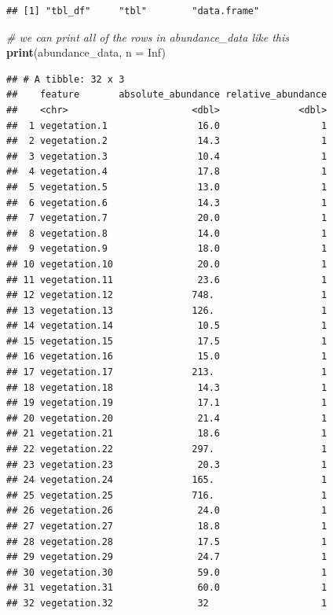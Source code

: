 \documentclass[12pt,]{book}
\newenvironment{Shaded}{\begin{snugshade}}{\end{snugshade}}
\newcommand{\KeywordTok}[1]{\textcolor[rgb]{0.13,0.29,0.53}{\textbf{#1}}}
\newcommand{\DataTypeTok}[1]{\textcolor[rgb]{0.13,0.29,0.53}{#1}}
\newcommand{\CommentTok}[1]{\textcolor[rgb]{0.56,0.35,0.01}{\textit{#1}}}
\newcommand{\OtherTok}[1]{\textcolor[rgb]{0.56,0.35,0.01}{#1}}
\newcommand{\NormalTok}[1]{#1}
\begin{document}
\begin{verbatim}
## [1] "tbl_df"     "tbl"        "data.frame"
\end{verbatim}

\begin{Shaded}
\begin{Highlighting}[]
\CommentTok{# we can print all of the rows in abundance_data like this}
\KeywordTok{print}\NormalTok{(abundance_data, }\DataTypeTok{n =} \OtherTok{Inf}\NormalTok{)}
\end{Highlighting}
\end{Shaded}

\begin{verbatim}
## # A tibble: 32 x 3
##    feature       absolute_abundance relative_abundance
##    <chr>                      <dbl>              <dbl>
##  1 vegetation.1                16.0                  1
##  2 vegetation.2                14.3                  1
##  3 vegetation.3                10.4                  1
##  4 vegetation.4                17.8                  1
##  5 vegetation.5                13.0                  1
##  6 vegetation.6                14.3                  1
##  7 vegetation.7                20.0                  1
##  8 vegetation.8                14.0                  1
##  9 vegetation.9                18.0                  1
## 10 vegetation.10               20.0                  1
## 11 vegetation.11               23.6                  1
## 12 vegetation.12              748.                   1
## 13 vegetation.13              126.                   1
## 14 vegetation.14               10.5                  1
## 15 vegetation.15               17.5                  1
## 16 vegetation.16               15.0                  1
## 17 vegetation.17              213.                   1
## 18 vegetation.18               14.3                  1
## 19 vegetation.19               17.1                  1
## 20 vegetation.20               21.4                  1
## 21 vegetation.21               18.6                  1
## 22 vegetation.22              297.                   1
## 23 vegetation.23               20.3                  1
## 24 vegetation.24              165.                   1
## 25 vegetation.25              716.                   1
## 26 vegetation.26               24.0                  1
## 27 vegetation.27               18.8                  1
## 28 vegetation.28               17.5                  1
## 29 vegetation.29               24.7                  1
## 30 vegetation.30               59.0                  1
## 31 vegetation.31               60.0                  1
## 32 vegetation.32               32                    1
\end{verbatim}
\end{document}
